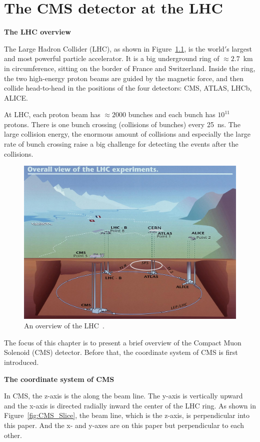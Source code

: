 \chapter{The CMS detector at the LHC}
\label{label: chapDetector}

{\bf The LHC overview}

The Large Hadron Collider (LHC), as shown in
Figure~\ref{fig:LHC}, is the world$'$s largest and most powerful particle accelerator. 
It is a big underground ring of ${\approx}2.7$~km in circumference, sitting on the border of France and Switzerland. 
Inside the ring, the two high-energy proton beams are guided by the 
magnetic force, and then collide head-to-head in the 
positions of the four detectors: CMS, ATLAS, LHCb, ALICE. 

At LHC, each proton beam has ${\approx}2000$ bunches and each bunch has $10^{11}$ protons. 
There is one bunch crossing (collisions of bunches) every 25~ns. The
large collision energy, the enormous amount of collisions and 
especially the large rate of bunch crossing
raise a big challenge for detecting the events after the collisions. 

\begin{figure}[!htbp]
\centering
\includegraphics[width=.7\textwidth]{figures/CERN-LHC.jpg}
\caption{An overview of the LHC~\cite{LHC}.}
\label{fig:LHC}
\end{figure}

 
The focus of this chapter is to present a brief overview of the Compact Muon Solenoid (CMS) detector. 
Before that, the coordinate system of CMS is first introduced. 

{\bf The coordinate system of CMS}

In CMS, the z-axis is the along the beam line. The y-axis is vertically upward and the x-axis is directed 
radially inward the center of the LHC ring. As shown in Figure~\ref{fig:CMS_Slice}, the beam line, which is the z-axis, is perpendicular into this paper. And the x- and y-axes are on this paper but perpendicular to each other. 

